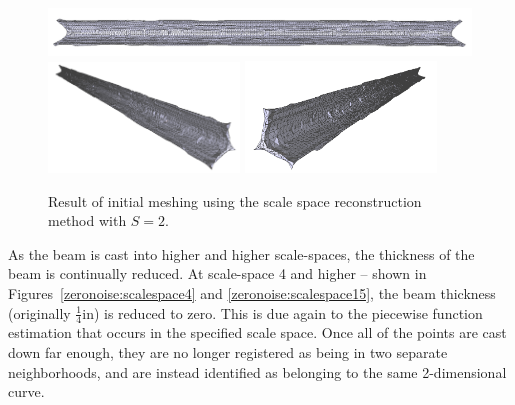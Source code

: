 \documentclass[12pt]{drexelthesis}
\begin{document}
\begin{figure}[!ht]
	\centering
		\includegraphics[width=5in]{simulated-lab-scan/0noise/cleanNeat/scalespace200.png}
		\includegraphics[width=2in]{simulated-lab-scan/0noise/cleanNeat/scalespace201.png}
		\includegraphics[width=2in]{simulated-lab-scan/0noise/cleanNeat/scalespace202.png}
		\caption[Initial meshing using a scale space reconstruction with $S = 2$]{\centering  Result of initial meshing using the scale space reconstruction method with $S = 2$.}
	\label{zeronoise:scalespace2}
\end{figure}

As the beam is cast into higher and higher scale-spaces, the thickness of the beam is continually reduced. At scale-space 4 and higher -- shown in Figures~\ref{zeronoise:scalespace4} and \ref{zeronoise:scalespace15}, the beam thickness (originally $\frac{1}{4}$in) is reduced to zero. This is due again to the piecewise function estimation that occurs in the specified scale space. Once all of the points are cast down far enough, they are no longer registered as being in two separate neighborhoods, and are instead identified as belonging to the same 2-dimensional curve.
\end{document}
